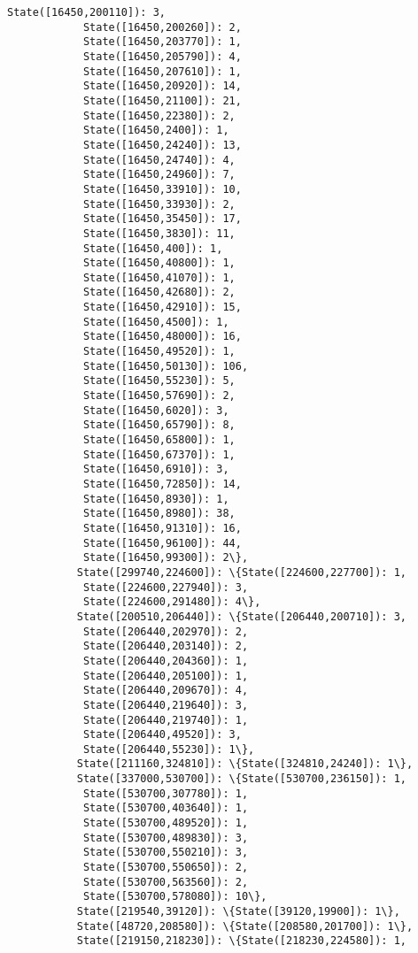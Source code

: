 \documentclass[11pt]{article}
\begin{document}
\begin{Verbatim}[commandchars=\\\{\}]
            State([16450,200110]): 3,
            State([16450,200260]): 2,
            State([16450,203770]): 1,
            State([16450,205790]): 4,
            State([16450,207610]): 1,
            State([16450,20920]): 14,
            State([16450,21100]): 21,
            State([16450,22380]): 2,
            State([16450,2400]): 1,
            State([16450,24240]): 13,
            State([16450,24740]): 4,
            State([16450,24960]): 7,
            State([16450,33910]): 10,
            State([16450,33930]): 2,
            State([16450,35450]): 17,
            State([16450,3830]): 11,
            State([16450,400]): 1,
            State([16450,40800]): 1,
            State([16450,41070]): 1,
            State([16450,42680]): 2,
            State([16450,42910]): 15,
            State([16450,4500]): 1,
            State([16450,48000]): 16,
            State([16450,49520]): 1,
            State([16450,50130]): 106,
            State([16450,55230]): 5,
            State([16450,57690]): 2,
            State([16450,6020]): 3,
            State([16450,65790]): 8,
            State([16450,65800]): 1,
            State([16450,67370]): 1,
            State([16450,6910]): 3,
            State([16450,72850]): 14,
            State([16450,8930]): 1,
            State([16450,8980]): 38,
            State([16450,91310]): 16,
            State([16450,96100]): 44,
            State([16450,99300]): 2\},
           State([299740,224600]): \{State([224600,227700]): 1,
            State([224600,227940]): 3,
            State([224600,291480]): 4\},
           State([200510,206440]): \{State([206440,200710]): 3,
            State([206440,202970]): 2,
            State([206440,203140]): 2,
            State([206440,204360]): 1,
            State([206440,205100]): 1,
            State([206440,209670]): 4,
            State([206440,219640]): 3,
            State([206440,219740]): 1,
            State([206440,49520]): 3,
            State([206440,55230]): 1\},
           State([211160,324810]): \{State([324810,24240]): 1\},
           State([337000,530700]): \{State([530700,236150]): 1,
            State([530700,307780]): 1,
            State([530700,403640]): 1,
            State([530700,489520]): 1,
            State([530700,489830]): 3,
            State([530700,550210]): 3,
            State([530700,550650]): 2,
            State([530700,563560]): 2,
            State([530700,578080]): 10\},
           State([219540,39120]): \{State([39120,19900]): 1\},
           State([48720,208580]): \{State([208580,201700]): 1\},
           State([219150,218230]): \{State([218230,224580]): 1,

\end{Verbatim}
\end{document}
